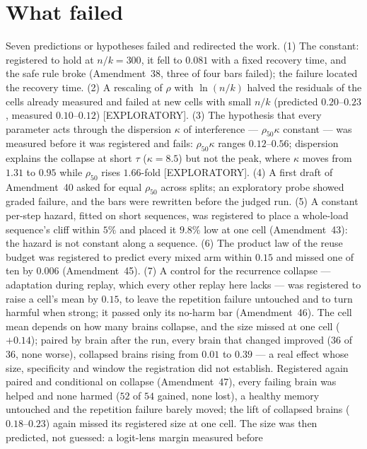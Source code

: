 \documentclass[11pt]{article}
\theoremstyle{definition}
\theoremstyle{plain}
\newcommand{\EXP}{\textnormal{\footnotesize\textsf{[EXPLORATORY]}}}
\begin{document}
\section{What failed}\label{sec:failed}

Seven predictions or hypotheses failed and redirected the work. (1) The
constant: registered to hold at $n/k = 300$, it fell to $0.081$ with a fixed
recovery time, and the safe rule broke (Amendment~38, three of four bars
failed); the failure located the recovery time. (2) A rescaling of $\rho$ with
$\ln(n/k)$ halved the residuals of the cells already measured and failed at new
cells with small $n/k$ (predicted $0.20$--$0.23$, measured $0.10$--$0.12$) \EXP.
(3) The hypothesis that every parameter acts through the dispersion $\kappa$ of
interference --- $\rho_{50}\kappa$ constant --- was measured before it was
registered and fails: $\rho_{50}\kappa$ ranges $0.12$--$0.56$; dispersion explains
the collapse at short $\tau$ ($\kappa = 8.5$) but not the peak, where $\kappa$
moves from $1.31$ to $0.95$ while $\rho_{50}$ rises $1.66$-fold \EXP. (4) A first
draft of Amendment~40 asked for equal $\rho_{50}$ across splits; an exploratory
probe showed graded failure, and the bars were rewritten before the judged run.
(5) A constant per-step hazard, fitted on short sequences, was registered to
place a whole-load sequence's cliff within $5\%$ and placed it $9.8\%$ low at one
cell (Amendment~43): the hazard is not constant along a sequence.
(6) The product law of the reuse budget was registered to predict every mixed
arm within $0.15$ and missed one of ten by $0.006$ (Amendment~45).
(7) A control for the recurrence collapse --- adaptation during replay, which
every other replay here lacks --- was registered to raise a cell's mean by $0.15$,
to leave the repetition failure untouched and to turn harmful when strong; it
passed only its no-harm bar (Amendment~46). The cell mean depends on how many
brains collapse, and the size missed at one cell ($+0.14$); paired by brain after
the run, every brain that changed improved ($36$ of $36$, none worse), collapsed
brains rising from $0.01$ to $0.39$ --- a real effect whose size, specificity and
window the registration did not establish.
Registered again paired and conditional on collapse (Amendment~47), every
failing brain was helped and none harmed ($52$ of $54$ gained, none lost), a
healthy memory untouched and the repetition failure barely moved; the lift
of collapsed brains ($0.18$--$0.23$) again missed its registered size at one cell.
The size was then predicted, not guessed: a logit-lens margin measured before
\end{document}
